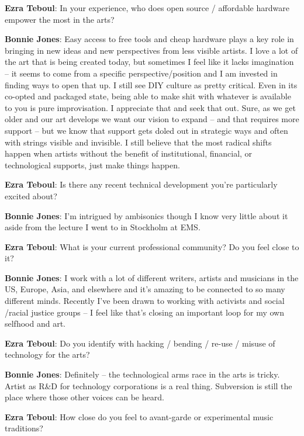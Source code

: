 \textbf{Ezra Teboul}: In your experience, who does open source / affordable hardware empower the most in the arts?

\textbf{Bonnie Jones}: Easy access to free tools and cheap hardware plays a key role in bringing in new ideas and new perspectives from less visible artists. I love a lot of the art that is being created today, but sometimes I feel like it lacks imagination – it seems to come from a specific perspective/position and I am invested in finding ways to open that up.  
I still see DIY culture as pretty critical. Even in its co-opted and packaged state, being able to make shit with whatever is available to you is pure improvisation. I appreciate that and seek that out. Sure, as we get older and our art develops we want our vision to expand – and that requires more support – but we know that support gets doled out in strategic ways and often with strings visible and invisible. I still believe that the most radical shifts happen when artists without the benefit of institutional, financial, or technological supports, just make things happen.  

\textbf{Ezra Teboul}: Is there any recent technical development you're particularly excited about? 

\textbf{Bonnie Jones}: I’m intrigued by ambisonics though I know very little about it aside from the lecture I went to in Stockholm at EMS. 

\textbf{Ezra Teboul}: What is your current professional community? Do you feel close to it?

\textbf{Bonnie Jones}: I work with a lot of different writers, artists and musicians in the US, Europe, Asia, and elsewhere and it’s amazing to be connected to so many different minds. Recently I’ve been drawn to working with activists and social /racial justice groups – I feel like that’s closing an important loop for my own selfhood and art. 

\textbf{Ezra Teboul}: Do you identify with hacking / bending / re-use / misuse of technology for the arts?

\textbf{Bonnie Jones}: Definitely – the technological arms race in the arts is tricky. Artist as R\&D for technology corporations is a real thing. Subversion is still the place where those other voices can be heard. 

\textbf{Ezra Teboul}: How close do you feel to avant-garde or experimental music traditions?

